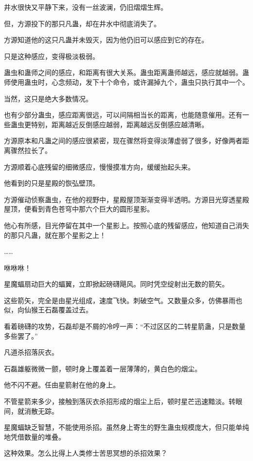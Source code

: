 
\begin{this_body}

井水很快又平静下来，没有一丝波澜，仍旧熠熠生辉。

但，方源投下的那只凡蛊，却在井水中彻底消失了。

方源知道他的这只凡蛊并未毁灭，因为他仍旧可以感应到它的存在。

只是这种感应，变得极淡极弱。

蛊虫和蛊师之间的感应，和距离有很大关系。蛊虫距离蛊师越远，感应就越弱。蛊师使用蛊虫时，心念频动，发下十个命令，或许漏掉九个，蛊虫只执行其中一个。

当然，这只是绝大多数情况。

也有少部分蛊虫，感应距离很远，可以间隔相当长的距离，也能随意催用。还有一些蛊虫更特别，距离越近反倒感应越弱，距离越远反倒感应越清晰。

方源原本和凡蛊之间的感应很紧密，现在骤然将变得淡薄虚弱了很多，好像两者距离骤然拉长了。

方源顺着心底残留的细微感应，慢慢摸准方向，缓缓抬起头来。

他看到的只是星殿的恢弘壁顶。

方源催动侦察蛊虫，在他的视野中，星殿屋顶渐渐变得半透明。方源目光穿透星殿屋顶，便看到青色苍穹中那六个巨大的圆形星影。

他心有所感，目光停留在其中一个星影上。按照心底的残留感应，他知道自己消失的那只凡蛊，就在那个星影之上！

……

咻咻咻！

星魔蝠扇动巨大的蝠翼，立即掀起磅礴飓风。同时凭空绽射出无数的箭矢。

这些箭矢，完全是由星光组成，速度飞快。刺破空气。又数量众多，仿佛暴雨也似，向仙猴王石磊覆盖过去。

看着磅礴的攻势，石磊却是不屑的冷哼一声：“不过区区的二转星箭蛊，只是数量多些罢了。”

凡道杀招落灰衣。

石磊雄躯微微一颤，顿时身上覆盖着一层薄薄的，黄白色的烟尘。

他不闪不避。任由星箭射在他的身上。

不管星箭来多少，接触到落灰衣杀招形成的烟尘上后，顿时星芒迅速黯淡。转眼间，就消散无踪。

星魔蝠缺乏智慧，不能使用杀招。虽然身上寄生的野生蛊虫规模庞大，但只能单纯地凭借数量的堆叠。

这种效果。怎么比得上人类修士苦思冥想的杀招效果？


\end{this_body}
